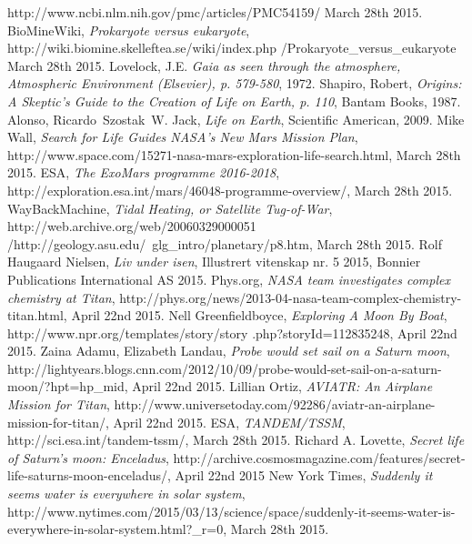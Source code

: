 \begin{thebibliography}{99}
		http://www.ncbi.nlm.nih.gov/pmc/articles/PMC54159/
		March 28th 2015.
		 BioMineWiki,
		\emph{Prokaryote versus eukaryote},
		http://wiki.biomine.skelleftea.se/wiki/index.php /Prokaryote\_versus\_eukaryote
		March 28th 2015.
		 Lovelock, J.E.
		\emph{Gaia as seen through the atmosphere, Atmospheric Environment (Elsevier), p. 579-580},
		1972.
		Shapiro, Robert,
		\emph{Origins: A Skeptic's Guide to the Creation of Life on Earth, p. 110},
		Bantam Books,
		1987.
		Alonso, Ricardo\, Szostak\, W. Jack,
		\emph{Life on Earth},
		Scientific American,
		2009.
		Mike Wall,
		\emph{Search for Life Guides NASA's New Mars Mission Plan},
		http://www.space.com/15271-nasa-mars-exploration-life-search.html,
		March 28th 2015.
		ESA,
		\emph{The ExoMars programme 2016-2018},
		http://exploration.esa.int/mars/46048-programme-overview/,
		March 28th 2015.
		WayBackMachine,
		\emph{Tidal Heating, or Satellite Tug-of-War},
		http://web.archive.org/web/20060329000051 /http://geology.asu.edu/~glg\_intro/planetary/p8.htm,
		March 28th 2015.
		Rolf Haugaard Nielsen,
		\emph{Liv under isen},
		Illustrert vitenskap nr. 5 2015,
		Bonnier Publications International AS
		2015.
		Phys.org,
		\emph{NASA team investigates complex chemistry at Titan},
		http://phys.org/news/2013-04-nasa-team-complex-chemistry-titan.html,
		April 22nd 2015.
		Nell Greenfieldboyce,
		\emph{Exploring A Moon By Boat},
		http://www.npr.org/templates/story/story .php?storyId=112835248,
		April 22nd 2015.
		Zaina Adamu, Elizabeth Landau,
		\emph{Probe would set sail on a Saturn moon},
		http://lightyears.blogs.cnn.com/2012/10/09/probe-would-set-sail-on-a-saturn-moon/?hpt=hp\_mid,
		April 22nd 2015.
		Lillian Ortiz,
		\emph{AVIATR: An Airplane Mission for Titan},
		http://www.universetoday.com/92286/aviatr-an-airplane-mission-for-titan/,
		April 22nd 2015.
		ESA,
		\emph{TANDEM/TSSM},
		http://sci.esa.int/tandem-tssm/,
		March 28th 2015.
		Richard A. Lovette,
		\emph{Secret life of Saturn’s moon: Enceladus},
		http://archive.cosmosmagazine.com/features/secret-life-saturns-moon-enceladus/,
		April 22nd 2015
		New York Times,
		\emph{Suddenly it seems water is everywhere in solar system},
		http://www.nytimes.com/2015/03/13/science/space/suddenly-it-seems-water-is-everywhere-in-solar-system.html?\_r=0,
		March 28th 2015.

\end{thebibliography}
